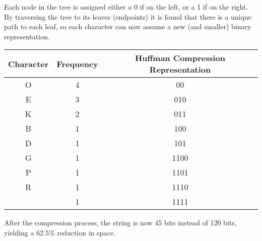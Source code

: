\documentclass{article}
\begin{document}
Each node in the tree is assigned either a 0 if on the left, or a 1 if on the right. By traversing the tree to its leaves (endpoints) it is found that there is a unique path to each leaf, so each character can now assume a new (and smaller) binary representation.
	\begin{center}
		\begin{tabular}{| c | c | c |}
			\hline
			Character & Frequency & Huffman Compression Representation\\
			\hline
			O & 4 & 00\\
			E & 3 & 010\\
			K & 2 & 011\\
			B & 1 & 100\\
			D & 1 & 101\\
			G & 1 & 1100\\
			P & 1 & 1101\\
			R & 1 & 1110\\
			  & 1 & 1111\\
			\hline
		\end{tabular}
	\end{center}
After the compression process, the string is now 45 bits instead of 120 bits, yielding a 62.5\% reduction in space.
\end{document}
